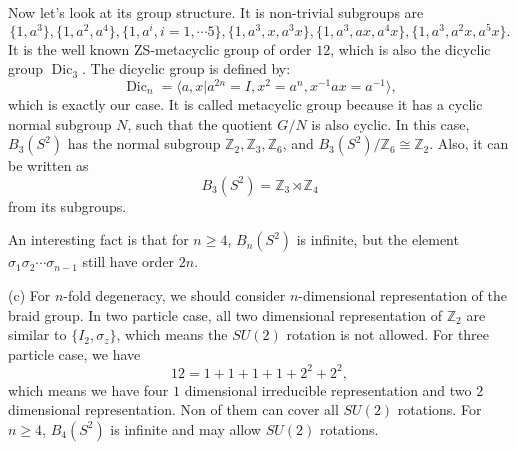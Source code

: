 \documentclass{book}
\begin{document}
Now let's look at its group structure. It is non-trivial subgroups are
\begin{equation*}
\{1,a^{3} \},\{1,a^{2} ,a^{4} \},\{1,a^{i} ,i=1,\cdots 5\},\{1,a^{3} ,x,a^{3} x\},\{1,a^{3} ,ax,a^{4} x\},\{1,a^{3} ,a^{2} x,a^{5} x\}.
\end{equation*}
It is the well known ZS-metacyclic group of order $12$, which is also the dicyclic group $\operatorname{Dic}_{3}$. The dicyclic group is defined by:
\begin{equation*}
\operatorname{Dic}_{n} =\langle a,x|a^{2n} =I,x^{2} =a^{n} ,x^{-1} ax=a^{-1} \rangle ,
\end{equation*}
which is exactly our case. It is called metacyclic group because it has a cyclic normal subgroup $N$, such that the quotient $G/N$ is also cyclic. In this case, $B_{3} (S^{2} )$ has the normal subgroup $\mathbb{Z}_{2} ,\mathbb{Z}_{3} ,\mathbb{Z}_{6}$, and $B_{3} (S^{2} )/\mathbb{Z}_{6} \cong \mathbb{Z}_{2}$. Also, it can be written as
\begin{equation*}
B_{3} (S^{2} )=\mathbb{Z}_{3} \rtimes \mathbb{Z}_{4}
\end{equation*}
from its subgroups. 

An interesting fact is that for $n\geq 4$, $B_{n} (S^{2} )$ is infinite\cite{gonccalves2013classification}, but the element $\sigma _{1} \sigma _{2} \cdots \sigma _{n-1}$ still have order $2n$. 


(c) For $n$-fold degeneracy, we should consider $n$-dimensional representation of the braid group. In two particle case, all two dimensional representation of $\mathbb{Z}_{2}$ are similar to $\{I_{2} ,\sigma _{z}\}$, which means the $SU( 2)$ rotation is not allowed. For three particle case, we have
\begin{equation*}
12=1+1+1+1+2^{2} +2^{2} ,
\end{equation*}
which means we have four $1$ dimensional irreducible representation and two $2$ dimensional representation. Non of them can cover all $SU( 2)$ rotations. For $n\geq 4$, $B_{4} (S^{2} )$ is infinite and may allow $SU( 2)$ rotations. 
\end{document}
